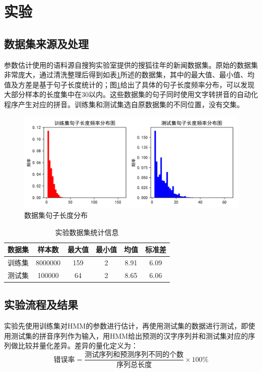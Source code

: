 \documentclass[12pt,a4paper]{ctexart}
\begin{document}
\section{实验}
\subsection{数据集来源及处理}
参数估计使用的语料源自搜狗实验室提供的搜狐往年的新闻数据集\cite{SogouCS}。原始的数据集非常庞大，通过清洗整理后得到如表\ref{table:dataset-stat}所述的数据集，其中的最大值、最小值、均值及方差是基于句子长度统计的；图\ref{fig:datasethistogram}给出了具体的句子长度频率分布，可以发现大部分样本的长度集中在30以内。这些数据集的句子同时使用文字转拼音的自动化程序\cite{python-pinyin}产生对应的拼音。训练集和测试集选自原数据集的不同位置，没有交集。
\bigskip
\begin{figure}[H]
	\centering
	\includegraphics[width=1\linewidth]{DataSetHistogram}
	\caption{数据集句子长度分布}
	\label{fig:datasethistogram}
\end{figure}
\bigskip
\begin{table}[H]
	\centering
\begin{tabular}{cccccc}
	\toprule  %
	数据集 & 样本数 & 最大值 & 最小值& 均值& 标准差\\
	\midrule  %
		训练集 & 8000000       & 159 & 2&8.91 & 6.09\\
测试集 & 100000 & 64 & 2 & 8.65 & 6.06\\
	\bottomrule %
\end{tabular}
\caption{实验数据集统计信息}
\label{table:dataset-stat}
\end{table}
\clearpage
\subsection{实验流程及结果}
实验先使用训练集对HMM的参数进行估计，再使用测试集的数据进行测试，即使用测试集的拼音序列作为输入，用HMM给出预测的汉字序列并和测试集对应的序列做比较并量化差异。差异的量化定义为：
\bigskip
\[ \mbox{错误率}=\frac{\mbox{测试序列和预测序列不同的个数}}{\mbox{序列总长度}} \times 100\% \]
\end{document}
